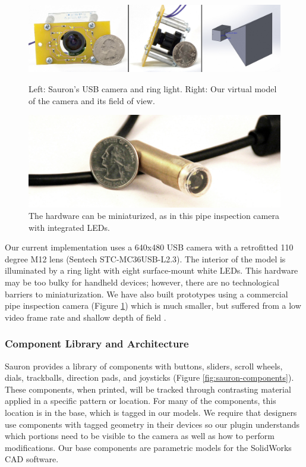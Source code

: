\begin{figure}
\centering
\includegraphics[width=\textwidth]{figures/sauron/camera-front-and-side.jpg}
\caption{Left: Sauron's USB camera and ring light. Right: Our virtual model of the camera and its field of view.}
\label{fig:sauron-hardware}
\vspace{0.2in}
\includegraphics[width=\textwidth]{figures/sauron/pipe-camera2.jpg}
\caption{The hardware can be miniaturized, as in this pipe inspection camera with integrated LEDs.}
\label{fig:sauron-inspectioncam}
\end{figure}

Our current implementation uses a 640x480 USB camera with a retrofitted 110 degree M12 lens (Sentech STC-MC36USB-L2.3). The interior of the model is illuminated by a ring light with eight surface-mount white LEDs. This hardware may be too bulky for handheld devices; however, there are no technological barriers to miniaturization. We have also built prototypes using a commercial pipe inspection camera (Figure \ref{fig:sauron-inspectioncam}) which is much smaller, but suffered from a low video frame rate and shallow depth of field .


\subsubsection{Component Library and Architecture }
Sauron provides a library of components with buttons, sliders, scroll wheels, dials, trackballs, direction pads, and joysticks (Figure \ref{fig:sauron-components}). These components, when printed, will be tracked through contrasting material applied in a specific pattern or location. For many of the components, this location is in the base, which is tagged in our models. We require that designers use components with tagged geometry in their devices so our plugin understands which portions need to be visible to the camera as well as how to perform modifications. Our base components are parametric models for the SolidWorks CAD software.

